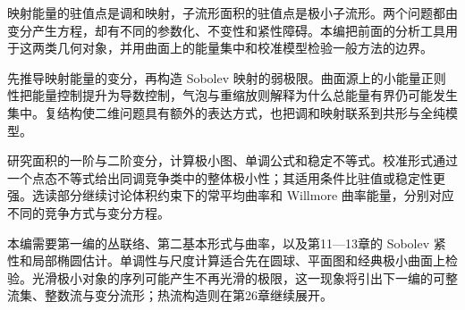 
% 

\BookPartGuide
映射能量的驻值点是调和映射，子流形面积的驻值点是极小子流形。两个问题都由变分产生方程，却有不同的参数化、不变性和紧性障碍。本编把前面的分析工具用于这两类几何对象，并用曲面上的能量集中和校准模型检验一般方法的边界。

\ProseParagraphBreak
{}先推导映射能量的变分，再构造 Sobolev 映射的弱极限。曲面源上的小能量正则性把能量控制提升为导数控制，气泡与重缩放则解释为什么总能量有界仍可能发生集中。复结构使二维问题具有额外的表达方式，也把调和映射联系到共形与全纯模型。

\ProseParagraphBreak
{}研究面积的一阶与二阶变分，计算极小图、单调公式和稳定不等式。校准形式通过一个点态不等式给出同调竞争类中的整体极小性；其适用条件比驻值或稳定性更强。选读部分继续讨论体积约束下的常平均曲率和 Willmore 曲率能量，分别对应不同的竞争方式与变分方程。

\ProseParagraphBreak
本编需要第一编的丛联络、第二基本形式与曲率，以及第11—13章的 Sobolev 紧性和局部椭圆估计。单调性与尺度计算适合先在圆球、平面图和经典极小曲面上检验。光滑极小对象的序列可能产生不再光滑的极限，这一现象将引出下一编的可整流集、整数流与变分流形；热流构造则在第26章继续展开。



